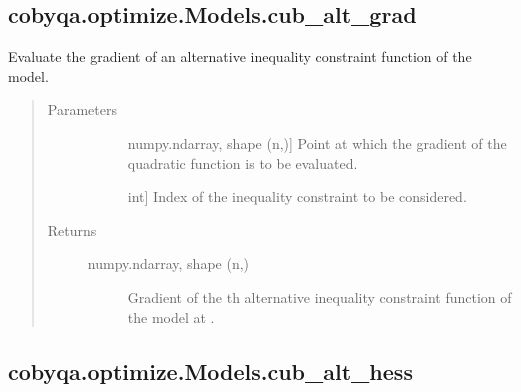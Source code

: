 \documentclass[letterpaper,10pt,english]{sphinxmanual}
\begin{document}
\begin{fulllineitems}
\subsection{cobyqa.optimize.Models.cub\_alt\_grad}
\label{\detokenize{refs/generated/cobyqa.optimize.Models.cub_alt_grad:cobyqa-optimize-models-cub-alt-grad}}\label{\detokenize{refs/generated/cobyqa.optimize.Models.cub_alt_grad::doc}}

\begin{fulllineitems}
\label{\detokenize{refs/generated/cobyqa.optimize.Models.cub_alt_grad:cobyqa.optimize.Models.cub_alt_grad}}
\sphinxAtStartPar
Evaluate the gradient of an alternative inequality constraint function
of the model.
\begin{quote}\begin{description}
\item[{Parameters}] \leavevmode\begin{description}
\item[{}] \leavevmode{[}numpy.ndarray, shape (n,){]}
\sphinxAtStartPar
Point at which the gradient of the quadratic function is to be
evaluated.

\item[{}] \leavevmode{[}int{]}
\sphinxAtStartPar
Index of the inequality constraint to be considered.

\end{description}

\item[{Returns}] \leavevmode\begin{description}
\item[{numpy.ndarray, shape (n,)}] \leavevmode
\sphinxAtStartPar
Gradient of the \sphinxhyphen{}th alternative inequality constraint function of
the model at .

\end{description}

\end{description}\end{quote}

\end{fulllineitems}



\subsection{cobyqa.optimize.Models.cub\_alt\_hess}
\label{\detokenize{refs/generated/cobyqa.optimize.Models.cub_alt_hess:cobyqa-optimize-models-cub-alt-hess}}\label{\detokenize{refs/generated/cobyqa.optimize.Models.cub_alt_hess::doc}}


\end{fulllineitems}
\end{document}
